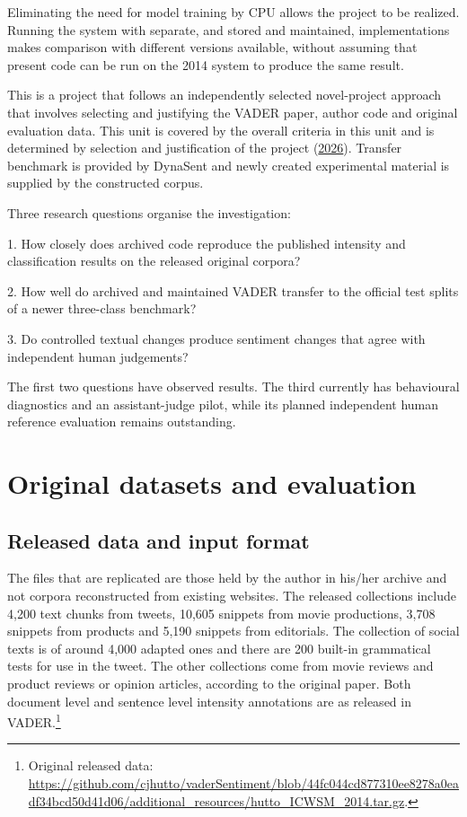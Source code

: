 \documentclass[11pt]{article}
\begin{document}
Eliminating the need for model training by CPU allows the project to be realized. Running the system with separate, and stored and maintained, implementations makes comparison with different versions available, without assuming that present code can be run on the 2014 system to produce the same result.


This is a project that follows an independently selected novel-project approach that involves selecting and justifying the VADER paper, author code and original evaluation data. This unit is covered by the overall criteria in this unit and is determined by selection and justification of the project (\hyperlink{ref_courseCriteria2026}{2026}). Transfer benchmark is provided by DynaSent and newly created experimental material is supplied by the constructed corpus.


Three research questions organise the investigation:


1.         How closely does archived code reproduce the published intensity and classification results on the released original corpora?


2.         How well do archived and maintained VADER transfer to the official test splits of a newer three-class benchmark?


3.         Do controlled textual changes produce sentiment changes that agree with independent human judgements?


The first two questions have observed results. The third currently has behavioural diagnostics and an assistant-judge pilot, while its planned independent human reference evaluation remains outstanding.


\section{Original datasets and evaluation}

\subsection{Released data and input format}

The files that are replicated are those held by the author in his/her archive and not corpora reconstructed from existing websites. The released collections include 4,200 text chunks from tweets, 10,605 snippets from movie productions, 3,708 snippets from products and 5,190 snippets from editorials. The collection of social texts is of around 4,000 adapted ones and there are 200 built-in grammatical tests for use in the tweet. The other collections come from movie reviews and product reviews or opinion articles, according to the original paper. Both document level and sentence level intensity annotations are as released in VADER.\footnote{Original released data: \url{https://github.com/cjhutto/vaderSentiment/blob/44fc044cd877310ee8278a0eadf34bcd50d41d06/additional_resources/hutto_ICWSM_2014.tar.gz}.}
\end{document}
